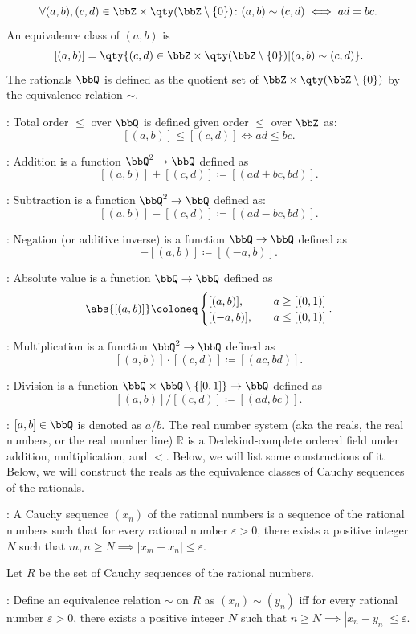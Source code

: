 \documentclass[a4paper,12pt]{article}
\begin{document}
\[\forall(a,b),(c,d)\in\bbZ\times\qty(\bbZ\setminus\{0\})\colon(a,b)\sim(c,d)\iff ad=bc.\]
An equivalence class of $(a,b)$ is
\[[(a,b)]=\qty\{(c,d)\in\bbZ\times\qty(\bbZ\setminus\{0\})|(a,b)\sim(c,d)\}.\]
The rationals $\bbQ$ is defined as the quotient set of $\bbZ\times\qty(\bbZ\setminus\{0\})$ by the equivalence relation $\sim$.
\item {}: Total order $\leq$ over $\bbQ$ is defined given order $\leq$ over $\bbZ$ as:
\[[(a,b)]\leq[(c,d)]\iff ad\leq bc.\]
\item {}: Addition is a function $\bbQ^2\to\bbQ$ defined as
\[[(a,b)]+[(c,d)]\coloneq[(ad+bc,bd)].\]
\item {}: Subtraction is a function $\bbQ^2\to\bbQ$ defined as:
\[[(a,b)]-[(c,d)]\coloneq[(ad-bc,bd)].\]
\item {}: Negation (or additive inverse) is a function $\bbQ\to\bbQ$ defined as
\[-[(a,b)]\coloneq[(-a,b)].\]
\item {}: Absolute value is a function $\bbQ\to\bbQ$ defined as
\[\abs{[(a,b)]}\coloneq\begin{cases}[(a,b)],\quad&a\geq [(0,1)]\\
[(-a,b)],\quad&a\leq [(0,1)]\end{cases}.\]
\item {}: Multiplication is a function $\bbQ^2\to\bbQ$ defined as
\[[(a,b)]\cdot [(c,d)]\coloneq[(ac,bd)].\]
\item {}: Division is a function $\bbQ\times\bbQ\setminus\{[0,1]\}\to\bbQ$ defined as
\[[(a,b)]/[(c,d)]\coloneq[(ad,bc)].\]
\item {}: $[a,b]\in\bbQ$ is denoted as $a/b$.
\eit
{}
The real number system (aka the reals, the real numbers, or the real number line) $\mathbb{R}$ is a Dedekind-complete ordered field under addition, multiplication, and $<$. Below, we will list some constructions of it.
Below, we will construct the reals as the equivalence classes of Cauchy sequences of the rationals.
\bit
\item{}: A Cauchy sequence $(x_n)$ of the rational numbers is a sequence of the rational numbers such that for every rational number $\varepsilon>0$, there exists a positive integer $N$ such that $m,n\geq N\implies|x_m−x_n|\leq\varepsilon$.

Let $R$ be the set of Cauchy sequences of the rational numbers.
\item {}: Define an equivalence relation $\sim$ on $R$ as $(x_n)\sim(y_n)$ iff for every rational number $\varepsilon>0$, there exists a positive integer $N$ such that $n\geq N\implies|x_n−y_n|\leq\varepsilon$.
\end{document}

